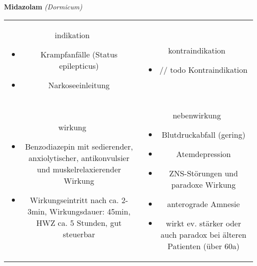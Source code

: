 \begin{frame}{
    \textbf{Midazolam}
    \textit{(Dormicum)}
}
    \begin{tabular}{c c}
        \begin{beamercolorbox}[wd=\boxwidth\textwidth,ht=\boxheight\textheight,sep=1em]{indikation}
            \begin{itemize}
                \item Krampfanfälle (Status epilepticus)
                \item Narkoseeinleitung
            \end{itemize}
        \end{beamercolorbox} & 
        \begin{beamercolorbox}[wd=\boxwidth\textwidth,ht=\boxheight\textheight,sep=1em]{kontraindikation}
            \begin{itemize}
                \item // todo Kontraindikation 
            \end{itemize}
        \end{beamercolorbox} \\
        \begin{beamercolorbox}[wd=\boxwidth\textwidth,ht=\boxheight\textheight,sep=1em]{wirkung}
            \begin{itemize}
                \item Benzodiazepin mit sedierender, anxiolytischer, antikonvulsier und muskelrelaxierender Wirkung
                \item Wirkungseintritt nach ca. 2-3min, Wirkungsdauer: 45min, HWZ ca. 5 Stunden, gut steuerbar
            \end{itemize}
        \end{beamercolorbox} & 
        \begin{beamercolorbox}[wd=\boxwidth\textwidth,ht=\boxheight\textheight,sep=1em]{nebenwirkung}
            \begin{itemize}
                \item Blutdruckabfall (gering)
                \item Atemdepression
                \item ZNS-Störungen und paradoxe Wirkung
                \item anterograde Amnesie
                \item wirkt ev. stärker oder auch paradox bei älteren Patienten (über 60a)
            \end{itemize}
        \end{beamercolorbox} \\
    \end{tabular}
\end{frame}

